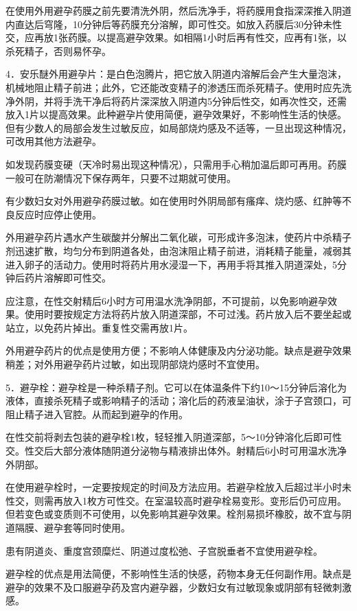 \documentclass[12pt,UTF8,openany]{ctexbook}
\begin{document}
在使用外用避孕药膜之前先要清洗外阴，然后洗净手，将药膜用食指深深推入阴道内直达后穹隆，10分钟后等药膜充分溶解，即可性交。如放入药膜后30分钟未性交，应再放1张药膜。以提高避孕效果。如相隔1小时后再有性交，应再有1张，以杀死精子，否则易怀孕。

4．安乐醚外用避孕片：是白色泡腾片，把它放入阴道内溶解后会产生大量泡沫，机械地阻止精子前进；此外，它还能改变精子的渗透压而杀死精子。使用时应先洗净外阴，并将手洗干净后将药片深深放入阴道内5分钟后性交，如再次性交，还需放入1片以提高效果。此种避孕片使用简便，避孕效果好，不影响性生活的快感。但有少数人的局部会发生过敏反应，如局部烧灼感及不适等，一旦出现这种情况，可改用其他方法避孕。

如发现药膜变硬（天冷时易出现这种情况），只需用手心稍加温后即可再用。药膜一般可在防潮情况下保存两年，只要不过期就可使用。

有少数妇女对外用避孕药膜过敏。如在使用时外阴局部有瘙痒、烧灼感、红肿等不良反应时应停止使用。

外用避孕药片遇水产生碳酸并分解出二氧化碳，可形成许多泡沫，使药片中杀精子剂迅速扩散，均匀分布到阴道各处，由泡沫阻止精子前进，消耗精子能量，减弱其进入卵子的活动力。使用时将药片用水浸湿一下，再用手将其推入阴道深处，5分钟后药片溶解即可性交。

应注意，在性交射精后6小时方可用温水洗净阴部，不可提前，以免影响避孕效果。使用时要按规定方法将药片放入阴道深部，不可过浅。药片放入后不要坐起或站立，以免药片掉出。重复性交需再放1片。

外用避孕药片的优点是使用方便；不影响人体健康及内分泌功能。缺点是避孕效果稍差；对外用避孕药片过敏，如出现阴部烧灼感时不宜使用。

5．避孕栓：避孕栓是一种杀精子剂。它可以在体温条件下约10～15分钟后溶化为液体，直接杀死精子或影响精子的活动；溶化后的药液呈油状，涂于子宫颈口，可阻止精子进入官腔。从而起到避孕的作用。

在性交前将剥去包装的避孕栓1枚，轻轻推入阴道深部，5～10分钟溶化后即可性交。性交后大部分液体随阴道分泌物与精液排出体外。射精后6小时可用温水洗净外阴部。

在使用避孕栓时，一定要按规定的时间及方法应用。若避孕栓放入后超过半小时未性交，则需再放入1枚方可性交。在室温较高时避孕栓易变形。变形后仍可应用。但若变色或变质则不可使用，以免影响其避孕效果。栓剂易损坏橡胶，故不宜与阴道隔膜、避孕套等同时使用。

患有阴道炎、重度宫颈糜烂、阴道过度松弛、子宫脱垂者不宜使用避孕栓。

避孕栓的优点是用法简便，不影响性生活的快感，药物本身无任何副作用。缺点是避孕的效果不及口服避孕药及宫内避孕器，少数妇女有过敏现象或阴部有轻微刺激感。
\end{document}
